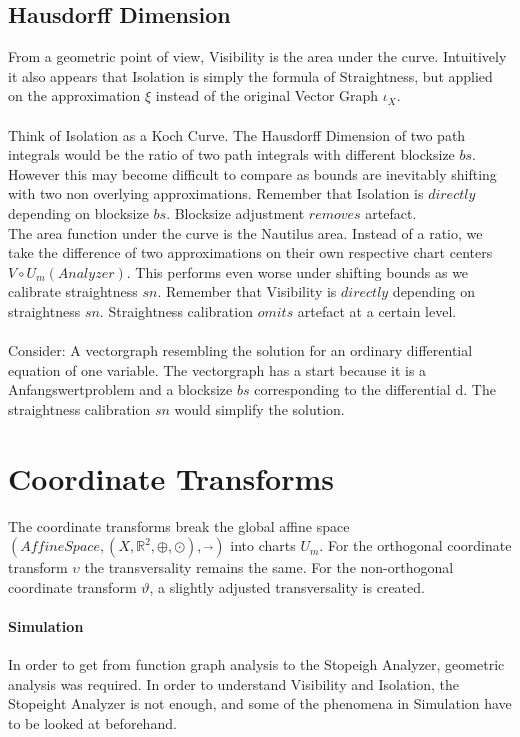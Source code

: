 \documentclass{report}
\begin{document}
\section{Hausdorff Dimension}

From a geometric point of view, Visibility is the area under the curve. Intuitively it also appears that Isolation is simply the formula of Straightness, but applied on the approximation $\xi$ instead of the original Vector Graph $\iota_{X}$.\\\\
Think of Isolation as a Koch Curve. The Hausdorff Dimension of two path integrals would be the ratio of two path integrals with different blocksize $bs$. However this may become difficult to compare as bounds are inevitably shifting with two non overlying approximations. Remember that Isolation is $directly$ depending on blocksize $bs$. Blocksize adjustment $removes$ artefact.\\
The area function under the curve is the Nautilus area. Instead of a ratio, we take the difference of two approximations on their own respective chart centers $V\circ U_{m}(Analyzer)$. This performs even worse under shifting bounds as we calibrate straightness $sn$. Remember that Visibility is $directly$ depending on straightness $sn$. Straightness calibration $omits$ artefact at a certain level.\\\\
Consider: A vectorgraph resembling the solution for an ordinary differential equation of one variable. The vectorgraph has a start because it is a Anfangswertproblem and a blocksize $bs$ corresponding to the differential $\mathrm{d}$. The straightness calibration $sn$ would simplify the solution.

\chapter{Coordinate Transforms}
The coordinate transforms break the global affine space $(AffineSpace,(X,\mathbb{R}^2,\oplus,\odot),\overrightarrow{\text{ }})$ into charts $U_{m}$. For the orthogonal coordinate transform $\upsilon$ the transversality remains the same. For the non-orthogonal coordinate transform $\vartheta$, a slightly adjusted transversality is created.

\subsubsection*{Simulation}
In order to get from function graph analysis to the Stopeigh Analyzer, geometric analysis was required. In order to understand Visibility and Isolation, the Stopeight Analyzer is not enough, and some of the phenomena in Simulation have to be looked at beforehand.
\end{document}
